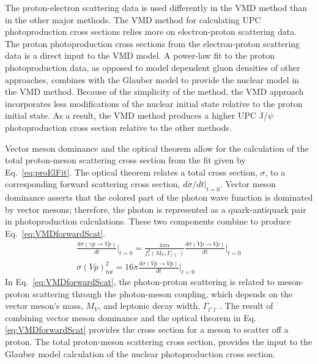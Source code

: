     The proton-electron scattering data is used differently in the VMD method 
      than in the other major methods.  
    The VMD method for calculating UPC photoproduction cross sections 
      relies more on electron-proton scattering data.
    The proton photoproduction cross sections from the electron-proton 
      scattering data is a direct input to the VMD model. 
    A power-law fit to the proton photoproduction data, as opposed to model 
      dependent gluon densities of other approaches, combines with the Glauber
      model to provide the nuclear model in the VMD method. 
    Because of the simplicity of the method, the VMD approach incorporates less
      modifications of the nuclear initial state relative to the proton initial
      state. 
    As a result, the VMD method produces a higher UPC J/$\psi$ photoproduction 
      cross section relative to the other methods. 

    Vector meson dominance and the optical theorem allow for the calculation of 
      the total proton-meson scattering cross section from the fit given by 
      Eq.~\ref{eq:proElFit}. 
    The optical theorem relates a total cross section, $\sigma$, 
      to a corresponding forward scattering cross section, $d\sigma/dt|_{t=0}$.
    Vector meson dominance asserts that the colored part of the photon wave 
      function is dominated by vector mesons; therefore, the photon is 
      represented as a quark-antiquark pair in photoproduction calculations. 
    These two components combine to produce Eq.~\ref{eq:VMDforwardScat}.
    \begin{eqnarray} \label{eq:VMDforwardScat}
      \frac{d\sigma(\gamma p\rightarrow Vp)}{dt}\Big|_{t=0}=
        \frac{4\pi \alpha}{f^{2}_{v}(M_{V},\Gamma_{l^{+}l^{-}})}\frac{d\sigma(Vp\rightarrow Vp)}{dt}
        \Big|_{t=0} \nonumber \\
       \sigma(Vp)_{tot}^{2}=16\pi\frac{d\sigma(Vp\rightarrow Vp)}{dt}\Big|_{t=0}
    \end{eqnarray}
    In Eq.~\ref{eq:VMDforwardScat}, the photon-proton scattering is related to
      meson-proton scattering through the photon-meson coupling, which 
      depends on the vector meson's mass, $M_{V}$, and leptonic decay width, 
      $\Gamma_{l^{+}l^{-}}$. 
    The result of combining vector meson dominance and the optical theorem 
      in Eq.\ref{eq:VMDforwardScat} provides the cross section for a meson to 
      scatter off a proton.
    The total proton-meson scattering cross section, provides 
      the input to the Glauber model calculation of the nuclear photoproduction 
      cross section. 

